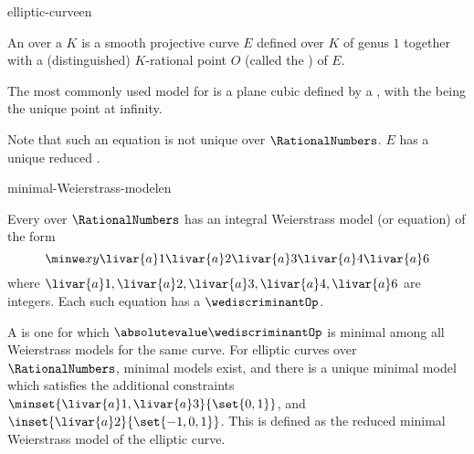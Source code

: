 \begin{mhmodnl}{elliptic-curve}{en}
  \begin{definition}[id=ec.q.def]
    An  over a  $K$ is a smooth projective
    curve $E$ defined over $K$ of genus $1$ together with a (distinguished) $K$-rational 
    point $O$ (called the ) of $E$.
  \end{definition}
  
  \begin{assertion}[type=remark]
    The most commonly used model for  is a plane cubic defined by
    a , with the 
    being the unique point at infinity.
  \end{assertion}
  
  \begin{assertion}[type=remark]
     Note that such an equation is not unique over
    $\RationalNumbers$. $E$ has a unique reduced
    .
  \end{assertion}
\end{mhmodnl}

\begin{mhmodnl}{minimal-Weierstrass-model}{en}
  \begin{definition}[id=ec.q.minimal-Weierstrass-model.def, 
    title=Minimal Weierstrass model of an elliptic curve on $\RationalNumbers$]
    Every  over $\RationalNumbers$ has an 
    integral Weierstrass model (or equation) of the form
    \[\minwe xy{\livar{a}1}{\livar{a}2}{\livar{a}3}{\livar{a}4}{\livar{a}6}\]
    where $\livar{a}1,\livar{a}2,\livar{a}3,\livar{a}4,\livar{a}6$ are integers.  Each
    such equation has a 
    $\wediscriminantOp$.

    A  is one for which
    $\absolutevalue\wediscriminantOp$ is minimal among all Weierstrass models
    for the same curve.  For elliptic curves over $\RationalNumbers$, minimal models
    exist, and there is a unique minimal model which satisfies the additional constraints
    $\minset{\livar{a}1,\livar{a}3}{\set{0,1}}$, and $\inset{\livar{a}2}{\set{-1,0,1}}$. 
    This is defined as the reduced minimal Weierstrass model of the elliptic curve.
  \end{definition}
\end{mhmodnl}
